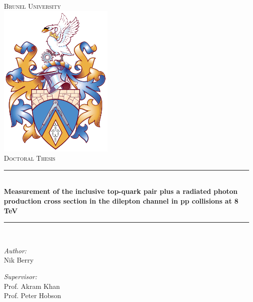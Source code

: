 \documentclass[oneside, a4paper, 11pt, ]{report}
\title{\ttitle} %
\begin{document}
\fancyfoot[C]{\thepage}
\renewcommand{\headrulewidth}{0.4pt}
\newcommand{\HRule}{\rule{\linewidth}{0.5mm}} %



\begin{titlepage}
\begin{center}

\textsc{\LARGE Brunel University}\\[0.5cm] %
\includegraphics[scale=0.5]{Figures/brunelshield.png} \\[0.5cm]
\textsc{\Large Doctoral Thesis}\\[0.5cm] %

\HRule \\[0.4cm] %
{\huge \bfseries Measurement of the inclusive top-quark pair plus a radiated photon production cross section in the dilepton channel in pp collisions at 8 TeV}\\[0.3cm] 
\HRule \\[1.5cm] %
 
\begin{minipage}{0.4\textwidth}
\begin{flushleft} \large
\emph{Author:}\\
Nik Berry 
\end{flushleft}
\end{minipage}
\begin{minipage}{0.4\textwidth}
\begin{flushright} \large
\emph{Supervisor:} \\
Prof. Akram Khan\\
Prof. Peter Hobson
\end{flushright}
\end{minipage}\\[2cm]


\end{center}
\end{titlepage}
\end{document}
